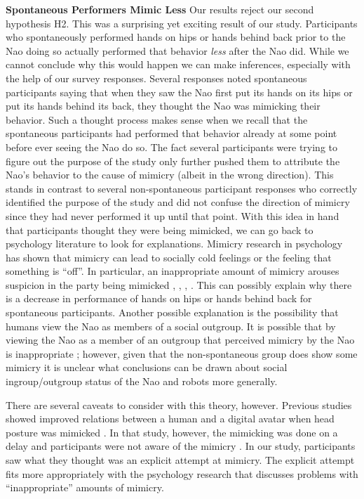 \documentclass{acm_proc_article-sp}
\begin{document}
\textbf{Spontaneous Performers Mimic Less} Our results reject our second hypothesis H2. This was a surprising yet exciting result of our study. Participants who spontaneously performed hands on hips or hands behind back prior to the Nao doing so actually performed that behavior \textit{less} after the Nao did. While we cannot conclude why this would happen we can make inferences, especially with the help of our survey responses. Several responses noted spontaneous participants saying that when they saw the Nao first put its hands on its hips or put its hands behind its back, they thought the Nao was mimicking their behavior. Such a thought process makes sense when we recall that the spontaneous participants had performed that behavior already at some point before ever seeing the Nao do so. The fact several participants were trying to figure out the purpose of the study only further pushed them to attribute the Nao's behavior to the cause of mimicry (albeit in the wrong direction). This stands in contrast to several non-spontaneous participant responses who correctly identified the purpose of the study and did not confuse the direction of mimicry since they had never performed it up until that point. With this idea in hand that participants thought they were being mimicked, we can go back to psychology literature to look for explanations. Mimicry research in psychology has shown that mimicry can lead to socially cold feelings or the feeling that something is ``off''. In particular, an inappropriate amount of mimicry arouses suspicion in the party being mimicked \cite{bargh2012substitutability}, \cite{leander2012you}, \cite{stel2010mimicking}, \cite{zhong2008cold}. This can possibly explain why there is a decrease in performance of hands on hips or hands behind back for spontaneous participants. Another possible explanation is the possibility that humans view the Nao as members of a social outgroup. It is possible that by viewing the Nao as a member of an outgroup that perceived mimicry by the Nao is inappropriate \cite{kavanagh2011s}; however, given that the non-spontaneous group does show some mimicry it is unclear what conclusions can be drawn about social ingroup/outgroup status of the Nao and robots more generally.

There are several caveats to consider with this theory, however. Previous studies showed improved relations between a human and a digital avatar when head posture was mimicked \cite{bailenson2005digital}. In that study, however, the mimicking was done on a delay and participants were not aware of the mimicry \cite{bailenson2005digital}. In our study, participants saw what they thought was an explicit attempt at mimicry. The explicit attempt fits more appropriately with the psychology research that discusses problems with ``inappropriate'' amounts of mimicry.
\end{document}
